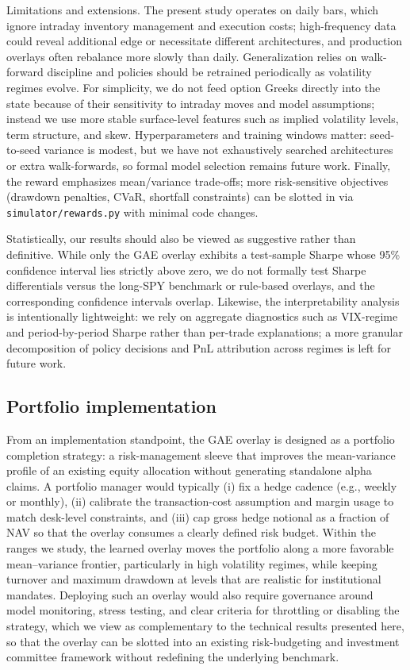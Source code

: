 \documentclass[,11pt,letterpaper,twocolumn]{article}
\begin{document}
Limitations and extensions. The present study operates on daily bars,
which ignore intraday inventory management and execution costs;
high-frequency data could reveal additional edge or necessitate
different architectures, and production overlays often rebalance more
slowly than daily. Generalization relies on walk-forward discipline and
policies should be retrained periodically as volatility regimes evolve.
For simplicity, we do not feed option Greeks directly into the state
because of their sensitivity to intraday moves and model assumptions;
instead we use more stable surface-level features such as implied
volatility levels, term structure, and skew. Hyperparameters and
training windows matter: seed-to-seed variance is modest, but we have
not exhaustively searched architectures or extra walk-forwards, so
formal model selection remains future work. Finally, the reward
emphasizes mean/variance trade-offs; more risk-sensitive objectives
(drawdown penalties, CVaR, shortfall constraints) can be slotted in via
\texttt{simulator/rewards.py} with minimal code changes.

Statistically, our results should also be viewed as suggestive rather
than definitive. While only the GAE overlay exhibits a test-sample
Sharpe whose 95\% confidence interval lies strictly above zero, we do
not formally test Sharpe differentials versus the long-SPY benchmark or
rule-based overlays, and the corresponding confidence intervals
overlap. Likewise, the interpretability analysis is intentionally
lightweight: we rely on aggregate diagnostics such as VIX-regime and
period-by-period Sharpe rather than per-trade explanations; a more
granular decomposition of policy decisions and PnL attribution across
regimes is left for future work.

\subsection{Portfolio implementation}
From an implementation standpoint, the GAE overlay is 
designed as a portfolio completion strategy: a risk-management sleeve 
that improves the mean-variance profile of an existing equity allocation 
without generating standalone alpha claims. A portfolio manager would
typically (i) fix a hedge cadence (e.g., weekly or
monthly), (ii) calibrate the transaction-cost assumption
and margin usage to match desk-level constraints, and
(iii) cap gross hedge notional as a fraction of NAV so
that the overlay consumes a clearly defined risk budget.
Within the ranges we study, the learned overlay moves the
portfolio along a more favorable mean–variance frontier,
particularly in high volatility regimes, while keeping
turnover and maximum drawdown at levels that are
realistic for institutional mandates. Deploying such an overlay would also require
governance around model monitoring, stress testing, and
clear criteria for throttling or disabling the strategy,
which we view as complementary to the technical results
presented here, so that the overlay can be slotted into an existing
risk-budgeting and investment committee framework without redefining the underlying benchmark.
\end{document}
